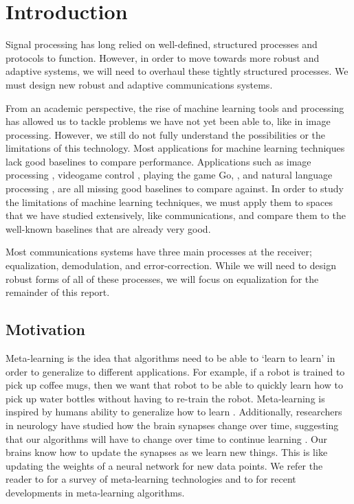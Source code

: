 \chapter{Introduction}

Signal processing has long relied on well-defined, structured processes and protocols to function.  
However, in order to move towards more robust and adaptive systems, we will need to overhaul these tightly structured processes.  We must design new robust and adaptive communications systems.

From an academic perspective, the rise of machine learning tools and processing has allowed us to tackle problems we have not yet been able to, like in image processing.  However, we still do not fully understand the possibilities or the limitations of this technology.  
Most applications for machine learning techniques lack good baselines to compare performance.
Applications such as image processing \cite{imagenet}, videogame control \cite{videogame}, playing the game Go, \cite{alphago}, and natural language processing \cite{nlp}, are all missing good baselines to compare against.
In order to study the limitations of machine learning techniques, we must apply them to spaces that we have studied extensively, like communications, and compare them to the well-known baselines that are already very good.

Most communications systems have three main processes at the receiver; equalization, demodulation, and error-correction.  While we will need to design robust forms of all of these processes, we will focus on equalization for the remainder of this report. 

\section{Motivation}

Meta-learning is the idea that algorithms need to be able to `learn to learn' in order to generalize to different applications.  For example, if a robot is trained to pick up coffee mugs, then we want that robot to be able to quickly learn how to pick up water bottles without having to re-train the robot.  
Meta-learning is inspired by humans ability to generalize how to learn \cite{lake}.  
Additionally, researchers in neurology have studied how the brain synapses change over time, suggesting that our algorithms will have to change over time to continue learning \cite{bengio}.
Our brains know how to update the synapses as we learn new things. This is like updating the weights of a neural network for new data points.  
We refer the reader to \cite{lemke} for a survey of meta-learning technologies and to \cite{finn} for recent developments in meta-learning algorithms.

